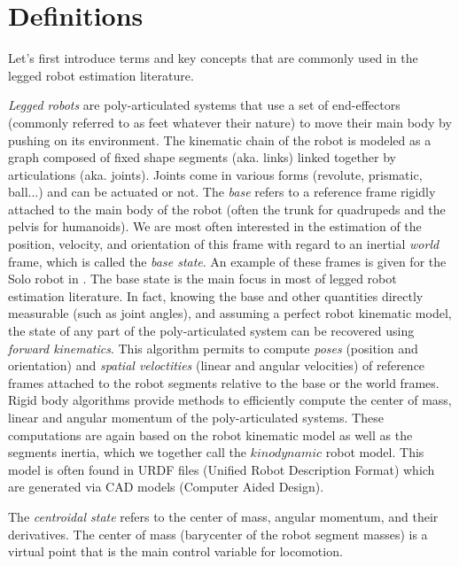 \section{Definitions}
\label{sec:def}
Let's first introduce terms and key concepts that are commonly used in the legged robot estimation literature.

\textit{Legged robots} are poly-articulated systems that use a set of end-effectors (commonly referred to as feet whatever their nature) to move their main body
by pushing on its environment. The kinematic chain of the robot is modeled as a graph composed of fixed shape segments (aka. links) 
linked together by articulations (aka. joints). Joints come in various forms (revolute, prismatic, ball...) and can be actuated or not.
The \textit{base} refers to a reference frame rigidly attached to the main body of the robot (often the trunk for quadrupeds and the pelvis for humanoids). 
We are most often interested in the estimation of the position, velocity, and orientation of this frame with regard to an inertial \textit{world} frame, which is called the \textit{base state}. 
An example of these frames is given for the Solo robot in .
The base state is the main focus in most of legged robot estimation literature. In fact, knowing the base and other quantities directly measurable (such as joint angles), 
and assuming a perfect robot kinematic model, the state of any part of the poly-articulated system can be recovered using \textit{forward kinematics}. 
This algorithm permits to compute \textit{poses} (position and orientation) and \textit{spatial veloctities} (linear and angular velocities) of reference
frames attached to the robot segments relative to the base or the world frames.
Rigid body algorithms \cite{featherstone2014rigid} provide methods to efficiently compute the center of mass, linear and angular momentum of the  poly-articulated systems. 
These computations are again based on the robot kinematic model as well as the segments inertia, which we together call the $kinodynamic$ robot model. This model is often 
found in URDF files (Unified Robot Description Format) which are generated via CAD models (Computer Aided Design).

The \textit{centroidal state} refers to the center of mass, angular momentum, and their derivatives. The center 
of mass (barycenter of the robot segment masses) is a virtual point that is the main control variable for locomotion. 

